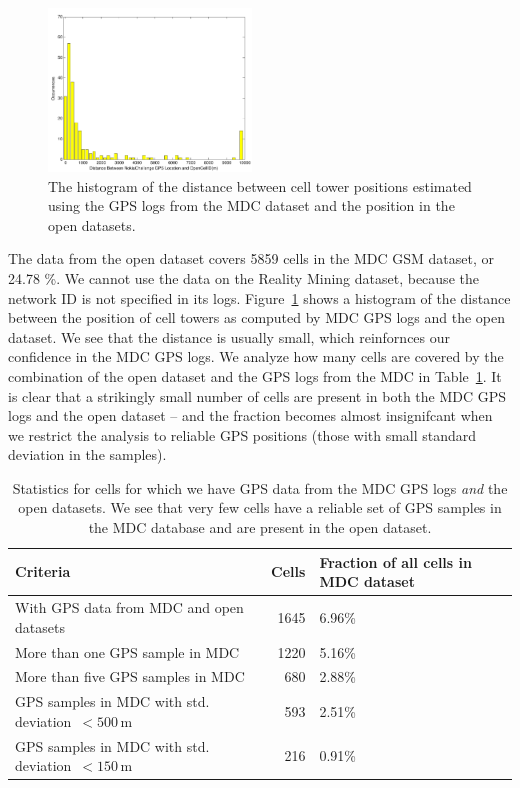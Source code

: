 \documentclass[letterpaper, 12pt, conference]{ieeeconf}
\begin{document}
\begin{figure}
\centering
\includegraphics[width=0.48\textwidth]{figs/mdc_open_distance}
\caption{The histogram of the distance between cell tower positions estimated 
using the GPS logs from the MDC dataset and the position in the open datasets.}
\label{fig:mdc_open_distance}
\end{figure}

The data from the open dataset covers 5859 cells in the MDC GSM dataset, or 24.78
\%. We cannot use the data on the Reality Mining dataset, because the network 
ID is not specified in its logs. Figure~\ref{fig:mdc_open_distance} shows a 
histogram of the distance between the position of cell towers as computed by 
MDC GPS logs and the open dataset. We see that the distance is usually small, 
which reinfornces our confidence in the MDC GPS logs. We analyze how many 
cells are covered by the combination of the open dataset and the GPS logs 
from the MDC in Table~\ref{tbl:open_mdc_stats}. It is clear that a strikingly 
small number of cells are present in both the MDC GPS logs and the open 
dataset -- and the fraction becomes almost insignifcant when we restrict the 
analysis to reliable GPS positions (those with small standard deviation in 
the samples).
\begin{table}
    \centering
    \begin{tabular}{ | m{2.8cm} || r | m{3cm} | }
    \hline
    Criteria & Cells & Fraction of all cells in MDC dataset \\
    \hline
		With GPS data from MDC and open datasets & 1645 & 6.96\%  \\
    \hline
		More than one GPS sample in MDC & 1220 & 5.16\% \\
    \hline
		More than five  GPS samples in MDC & 680 & 2.88\% \\
    \hline
		GPS samples in MDC with  std. deviation~$ < 500$\,m & 593 & 2.51\% \\
    \hline
		GPS samples in MDC with  std. deviation~$ < 150$\,m & 216 & 0.91\% \\
    \hline
    \end{tabular}
\caption{Statistics for cells for which we have GPS data from the MDC GPS 
logs \textit{and} the open datasets. We see that very few cells have a 
reliable set of GPS samples in the MDC database and are present in the open 
dataset. }
\label{tbl:open_mdc_stats}
\end{table}
\end{document}
